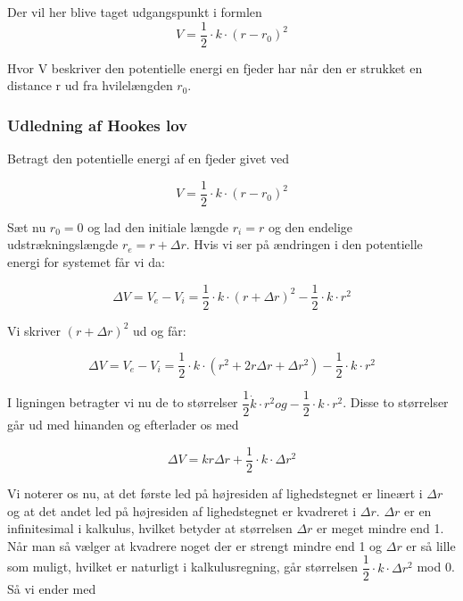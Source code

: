 \documentclass[12pt,a4paper]{article}
\theoremstyle{break}
\theoremstyle{nonumberplain}
\begin{document}
Der vil her blive taget udgangspunkt i formlen 
\begin{equation}
V=\dfrac{1}{2} \cdot k \cdot (r-r_{0})^2
\end{equation}

Hvor V beskriver den potentielle energi en fjeder har når den er strukket en distance r ud fra hvilelængden $r_0$. 

\subsubsection{Udledning af Hookes lov}
Betragt den potentielle energi af en fjeder givet ved

\bigskip

\begin{equation}
V=\dfrac{1}{2} \cdot k \cdot (r-r_{0})^2
\end{equation}

\bigskip

Sæt nu $r_0 = 0$ og lad den initiale længde $r_i = r$ og den endelige udstrækningslængde $r_e = r + \Delta r$. Hvis vi ser på ændringen i den potentielle energi for systemet får vi da:

\bigskip

\begin{equation}
\Delta V = V_e - V_i = \dfrac{1}{2} \cdot k \cdot (r+ \Delta r)^2 - \dfrac{1}{2} \cdot k \cdot r^2
\end{equation}

\bigskip

Vi skriver $(r + \Delta r)^2$ ud og får:

\bigskip

\begin{equation}
\Delta V = V_e - V_i = \dfrac{1}{2} \cdot k \cdot (r^2 + 2r \Delta r + \Delta r^2) - \dfrac{1}{2} \cdot k \cdot r^2 
\end{equation}

\bigskip

I ligningen betragter vi nu de to størrelser $\dfrac{1}{2} \dot k \cdot r^2 og - \dfrac{1}{2} \cdot k \cdot r^2$. Disse to størrelser går ud med hinanden og efterlader os med

\bigskip

\begin{equation}
\Delta V = kr \Delta r + \dfrac{1}{2} \cdot k \cdot \Delta r^2
\end{equation}

\pagebreak
Vi noterer os nu, at det første led på højresiden af lighedstegnet er lineært i $\Delta r$ og at det andet led på højresiden af lighedstegnet er kvadreret i $\Delta r$. $\Delta r$ er en infinitesimal i kalkulus, hvilket betyder at størrelsen $\Delta r$ er meget mindre end 1. Når man så vælger at kvadrere noget der er strengt mindre end 1 og $\Delta r$ er så lille som muligt, hvilket er naturligt i kalkulusregning, går størrelsen $\dfrac{1}{2} \cdot k \cdot \Delta r^2$ mod 0. Så vi ender med
\end{document}
